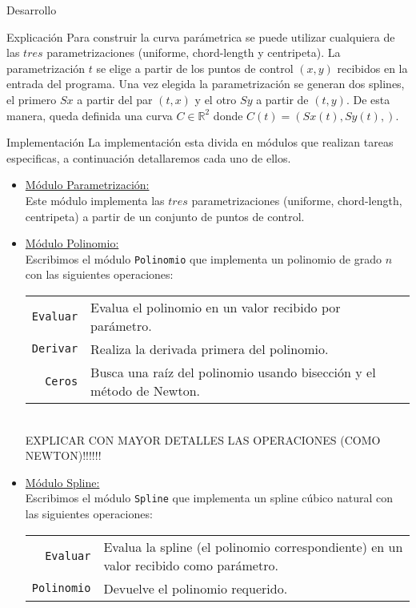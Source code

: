 \begin{section}{Desarrollo}
	\begin{subsection}{Explicación}
		Para construir la curva parámetrica se puede utilizar cualquiera de las $tres$ parametrizaciones (uniforme, chord-length y centripeta).
		La parametrización $t$ se elige a partir de los puntos de control $(x,y)$ recibidos en la entrada del programa.
		Una vez elegida la parametrización se generan dos splines, el primero $Sx$ a partir del par $(t,x)$ y el otro $Sy$ a partir de $(t,y)$.
		De esta manera, queda definida una curva $C \in \mathbb{R}^2$ donde $C(t) = (Sx(t),Sy(t),)$.
		
		
	\end{subsection}
	\begin{subsection}{Implementación}
		La implementación esta divida en módulos que realizan tareas especificas, a continuación detallaremos cada uno de ellos.
		
		\begin{itemize}
			\item \underline{Módulo Parametrización:}\\
				Este módulo implementa las $tres$ parametrizaciones (uniforme, chord-length, centripeta) a partir de un conjunto de puntos de control.
			\item \underline{Módulo Polinomio:}\\
				Escribimos el módulo \texttt{Polinomio} que implementa un polinomio de grado $n$ con las siguientes operaciones:\\
				
				\begin{tabular}{rl}
					\texttt{Evaluar} & Evalua el polinomio en un valor recibido por parámetro.\\
					\texttt{Derivar} & Realiza la derivada primera del polinomio.\\
					\texttt{Ceros}   & Busca una raíz del polinomio usando bisección y el método de Newton.\\
				\end{tabular}\\
				EXPLICAR CON MAYOR DETALLES LAS OPERACIONES (COMO NEWTON)!!!!!!
		
			\item \underline{Módulo Spline:}\\
				Escribimos el módulo \texttt{Spline} que implementa un spline cúbico natural con las siguientes operaciones:\\
				
				\begin{tabular}{rl}
					\texttt{Evaluar} & Evalua la spline (el polinomio correspondiente) en un valor recibido como parámetro.\\
					\texttt{Polinomio} & Devuelve el polinomio requerido.\\
				\end{tabular}\\


\end{itemize}
\end{subsection}
\end{section}
